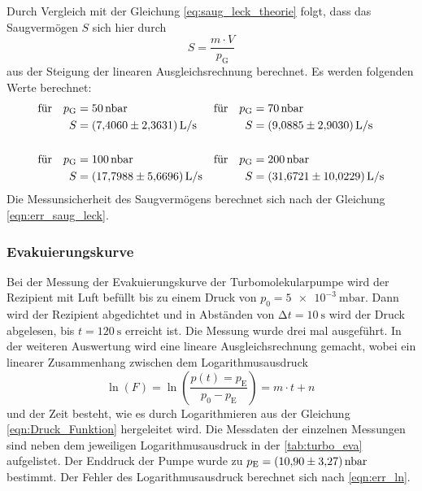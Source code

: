     \noindent Durch Vergleich mit der Gleichung \eqref{eq:saug_leck_theorie} folgt, dass das Saugvermögen $S$ sich hier durch
    \begin{equation*}
      S = \frac{m \cdot V}{p_\text{G}}
    \end{equation*}
    aus der Steigung der linearen Ausgleichsrechnung berechnet. Es werden folgenden Werte berechnet:
    \begin{align*}
      \text{für} \quad p_\text{G} &= \SI{50}{\nano\bar} & \text{für} \quad p_\text{G} &= \SI{70}{\nano\bar} \\
      S &= \SI{7.4060 \pm 2.3631}{L\per\second}  & S &= \SI{9.0885 \pm 2.903}{L\per\second}  \\
      \\
      \text{für} \quad p_\text{G} &= \SI{100}{\nano\bar} & \text{für} \quad p_\text{G} &= \SI{200}{\nano\bar} \\
      S &= \SI{17.7988 \pm 5.6696}{L\per\second}  & S &= \SI{31.6721 \pm 10.0229}{L\per\second}  
    \end{align*}
    Die Messunsicherheit des Saugvermögens berechnet sich nach der Gleichung \eqref{eqn:err_saug_leck}.

  \subsubsection{Evakuierungskurve}

    \noindent Bei der Messung der Evakuierungskurve der Turbomolekularpumpe wird der Rezipient mit Luft befüllt bis zu einem Druck von $p_0 = \SI{5e-3}{\milli\bar}$. Dann wird der Rezipient 
    abgedichtet und in Abständen von $\increment t = \SI{10}{\second}$ wird der Druck abgelesen, bis $ t = \SI{120}{\second}$ erreicht ist. Die Messung wurde drei mal ausgeführt.
    In der weiteren Auswertung wird eine lineare Ausgleichsrechnung gemacht, wobei ein linearer Zusammenhang zwischen dem Logarithmusausdruck 
    \begin{equation*}
      \ln(F) = \ln \left( \frac{p(t) = p_\text{E}}{p_0 - p_\text{E}}\right) = m \cdot t + n \, 
    \end{equation*} 
    und der Zeit besteht, wie es durch Logarithmieren aus der Gleichung \eqref{eqn:Druck_Funktion} hergeleitet wird. Die Messdaten der einzelnen Messungen sind neben dem jeweiligen Logarithmusausdruck in der \autoref{tab:turbo_eva} aufgelistet. 
    Der Enddruck der Pumpe wurde zu $p_\text{E} = \SI{10.9 \pm 3.27}{\nano\bar}$ bestimmt. Der Fehler des Logarithmusausdruck berechnet sich nach \eqref{eqn:err_ln}.
  

